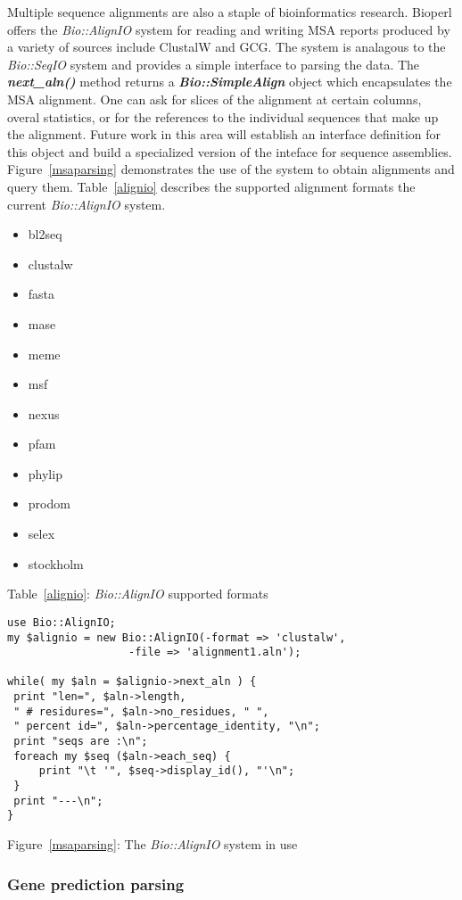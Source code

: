 \documentclass{article}
\begin{document}
Multiple sequence alignments are also a staple of bioinformatics
research.  Bioperl offers the \emph{Bio::AlignIO} system for reading
and writing MSA reports produced by a variety of sources include
ClustalW and GCG.  The system is analagous to the \emph{Bio::SeqIO}
system and provides a simple interface to parsing the data.  The {\it
\bf next\_aln()} method returns a \emph{\bf Bio::SimpleAlign} object
which encapsulates the MSA alignment.  One can ask for slices of the
alignment at certain columns, overal statistics, or for the references
to the individual sequences that make up the alignment.  Future work
in this area will establish an interface definition for this object
 and build a specialized version of the inteface for sequence
assemblies.  Figure~\ref{msaparsing} demonstrates the use of the
system to obtain alignments and query them.  Table~\ref{alignio}
describes the supported alignment formats the current
\emph{Bio::AlignIO} system.

\begin{itemize}
\item bl2seq
\item clustalw
\item fasta
\item mase
\item meme
\item msf
\item nexus
\item pfam
\item phylip
\item prodom
\item selex
\item stockholm
\end{itemize}
\label{alignio}
\centerline{Table~\ref{alignio}: \emph{Bio::AlignIO} supported formats}

\begin{verbatim}
use Bio::AlignIO;
my $alignio = new Bio::AlignIO(-format => 'clustalw',
			       -file => 'alignment1.aln');

while( my $aln = $alignio->next_aln ) {
 print "len=", $aln->length, 
 " # residures=", $aln->no_residues, " ",
 " percent id=", $aln->percentage_identity, "\n";
 print "seqs are :\n";
 foreach my $seq ($aln->each_seq) {
     print "\t '", $seq->display_id(), "'\n";
 }
 print "---\n";
}
\end{verbatim}
\label{msaparsing}
\centerline{Figure~\ref{msaparsing}: The \emph{Bio::AlignIO} system in use}

\subsubsection{Gene prediction parsing}
\end{document}
